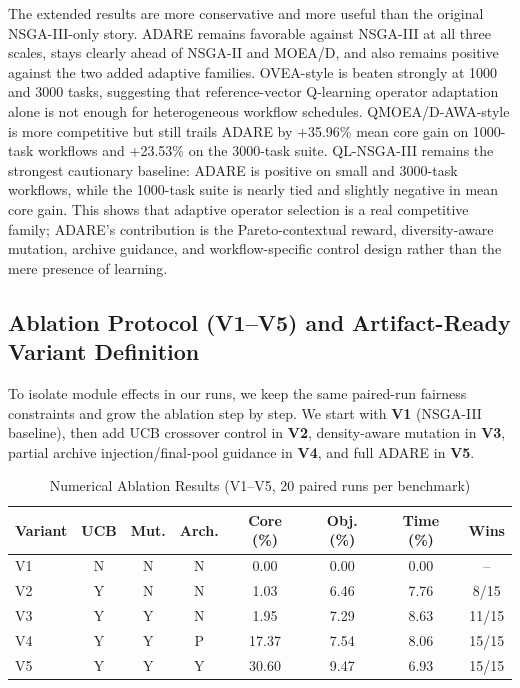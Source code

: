 \documentclass[runningheads]{llncs}
\begin{document}
The extended results are more conservative and more useful than the original NSGA-III-only story. ADARE remains favorable against NSGA-III at all three scales, stays clearly ahead of NSGA-II and MOEA/D, and also remains positive against the two added adaptive families. OVEA-style is beaten strongly at 1000 and 3000 tasks, suggesting that reference-vector Q-learning operator adaptation alone is not enough for heterogeneous workflow schedules. QMOEA/D-AWA-style is more competitive but still trails ADARE by +35.96\% mean core gain on 1000-task workflows and +23.53\% on the 3000-task suite. QL-NSGA-III remains the strongest cautionary baseline: ADARE is positive on small and 3000-task workflows, while the 1000-task suite is nearly tied and slightly negative in mean core gain. This shows that adaptive operator selection is a real competitive family; ADARE's contribution is the Pareto-contextual reward, diversity-aware mutation, archive guidance, and workflow-specific control design rather than the mere presence of learning.

\subsection{Ablation Protocol (V1--V5) and Artifact-Ready Variant Definition}
To isolate module effects in our runs, we keep the same paired-run fairness constraints and grow the ablation step by step. We start with \textbf{V1} (NSGA-III baseline), then add UCB crossover control in \textbf{V2}, density-aware mutation in \textbf{V3}, partial archive injection/final-pool guidance in \textbf{V4}, and full ADARE in \textbf{V5}.

\begin{table}[H]
\caption{Numerical Ablation Results (V1--V5, 20 paired runs per benchmark)}
\label{tab:ablation_design}
\centering
\small
\begin{tabular*}{\textwidth}{@{\extracolsep{\fill}}lccccccc@{}}
\toprule
Variant & UCB & Mut. & Arch. & Core (\%) & Obj. (\%) & Time (\%) & Wins \\
\midrule
V1 & N & N & N & 0.00 & 0.00 & 0.00 & -- \\
V2 & Y & N & N & 1.03 & 6.46 & 7.76 & 8/15 \\
V3 & Y & Y & N & 1.95 & 7.29 & 8.63 & 11/15 \\
V4 & Y & Y & P & 17.37 & 7.54 & 8.06 & 15/15 \\
V5 & Y & Y & Y & 30.60 & 9.47 & 6.93 & 15/15 \\
\bottomrule
\end{tabular*}
\end{table}
\end{document}
